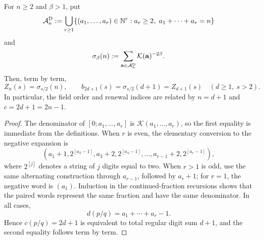 \begin{proposition}
\label{prop:dushistova-exact-identification}
For \(n\ge2\) and \(\beta>1\), put
\[
 \mathcal A_n^{\rm D}:=
 \bigcup_{r\ge1}\{(a_1,\ldots,a_r)\in\mathbb N^r:
                         a_r\ge2,\ a_1+\cdots+a_r=n\}
\]
and
\[
 \sigma_\beta(n):=\sum_{\mathbf a\in\mathcal A_n^{\rm D}}
                    \mathcal K(\mathbf a)^{-2\beta}.
\]
Then, term by term,
\begin{equation}
 Z_n(s)=\sigma_{s/2}(n),
 \qquad
 b_{2d+1}(s)=\sigma_{s/2}(d+1)=Z_{d+1}(s)
 \quad(d\ge1,\ s>2).
 \label{eq:dushistova-exact-identification}
\end{equation}
In particular, the field order and renewal indices are related by
\(n=d+1\) and \(c=2d+1=2n-1\).
\end{proposition}

\begin{proof}
The denominator of \([0;a_1,\ldots,a_r]\) is
\(\mathcal K(a_1,\ldots,a_r)\), so the first equality is immediate from
the definitions.  When \(r\) is even, the elementary conversion to the
negative expansion is
\[
 (a_1+1,2^{[a_2-1]},a_3+2,2^{[a_4-1]},\ldots,
   a_{r-1}+2,2^{[a_r-1]}),
\]
where \(2^{[j]}\) denotes a string of \(j\) digits equal to two.  When
\(r>1\) is odd, use the same alternating construction through \(a_{r-1}\),
followed by \(a_r+1\); for \(r=1\), the negative word is \((a_1)\).
Induction in the continued-fraction recursions shows that the paired words
represent the same fraction and have the same denominator.  In all cases,
\[
 d(p/q)=a_1+\cdots+a_r-1.
\]
Hence \(c(p/q)=2d+1\) is equivalent to total regular digit sum \(d+1\),
and the second equality follows term by term.
\end{proof}

